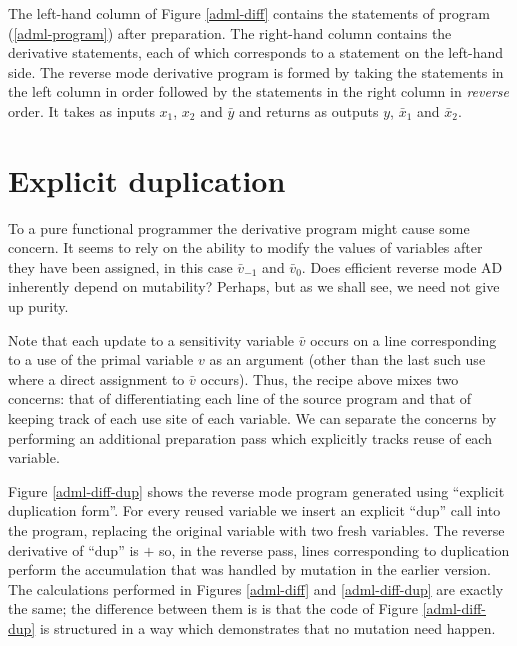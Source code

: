 \documentclass[12pt]{article}
\newcommand{\dup}{\mathrm{dup}}
\begin{document}
The left-hand column of Figure \ref{adml-diff} contains the statements
of program (\ref{adml-program}) after preparation.  The right-hand
column contains the derivative statements, each of which corresponds
to a statement on the left-hand side.  The reverse mode derivative
program is formed by taking the statements in the left column in order
followed by the statements in the right column in \emph{reverse}
order.  It takes as inputs $x_1$, $x_2$ and $\bar{y}$ and returns as
outputs $y$, $\bar{x}_1$ and $\bar{x}_2$.

\section{Explicit duplication}

To a pure functional programmer the derivative program might cause
some concern.  It seems to rely on the ability to modify the values of
variables after they have been assigned, in this case \(\bar{v}_{-1}\)
and \(\bar{v}_0\).  Does efficient reverse mode AD inherently depend on
mutability?  Perhaps, but as we shall see, we need not give up purity.

Note that each update to a sensitivity variable $\bar{v}$ occurs on a
line corresponding to a use of the primal variable $v$ as an argument
(other than the last such use where a direct assignment to $\bar{v}$
occurs). Thus, the recipe above mixes two concerns: that of
differentiating each line of the source program and that of keeping
track of each use site of each variable.  We can separate the concerns
by performing an additional preparation pass which explicitly tracks
reuse of each variable\cite{minka}.

Figure \ref{adml-diff-dup} shows the reverse mode program generated
using ``explicit duplication form''. For every reused variable we
insert an explicit ``$\dup$'' call into the program, replacing the
original variable with two fresh variables.  The reverse derivative of
``$\dup$'' is $+$ so, in the reverse pass, lines corresponding to
duplication perform the accumulation that was handled by mutation in
the earlier version.  The calculations performed in Figures
\ref{adml-diff} and \ref{adml-diff-dup} are exactly the same; the
difference between them is is that the code of Figure
\ref{adml-diff-dup} is structured in a way which demonstrates that no
mutation need happen.
\end{document}
